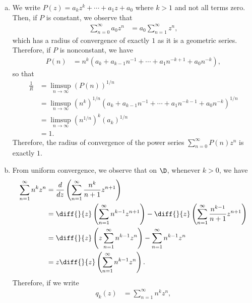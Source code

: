\documentclass[10pt]{mypackage}
\begin{document}
\begin{solution}\hfill
  \begin{enumerate}[(a)]
    \item We write $P(z) = a_kz^{k} + \cdots + a_1 z + a_0$ where $ k > 1 $ and not all terms zero. Then, if $P$ is constant, we observe that
      \begin{align*}
        \sum_{n=0}^{\infty}a_0z^{n} &= a_0\sum_{n=1}^{\infty}z^{n},
      \end{align*}
      which has a radius of convergence of exactly $1$ as it is a geometric series. Therefore, if $P$ is nonconstant, we have
      \begin{align*}
        P(n) &= n^{k}\left( a_k + a_{k-1}n^{-1} + \cdots + a_1 n^{-k+1} + a_0n^{-k} \right),
      \end{align*}
      so that
      \begin{align*}
        \frac{1}{R} &= \limsup_{n\rightarrow\infty} \left( P(n) \right)^{1/n}\\
                    &= \limsup_{n\rightarrow\infty} \left( n^{k} \right)^{1/n}\left( a_k + a_{k-1}n^{-1} + \cdots + a_1n^{-k-1} + a_0n^{-k} \right)^{1/n}\\
                    &= \limsup_{n\rightarrow\infty} \left( n^{1/n} \right)^{k}\left( a_k \right)^{1/n}\\
                    &= 1.
      \end{align*}
      Therefore, the radius of convergence of the power series $\sum_{n=0}^{\infty}P(n)z^{n}$ is exactly $1$.
    \item From uniform convergence, we observe that on $\D$, whenever $k > 0$, we have
      \begin{align*}
        \sum_{n=1}^{\infty}n^{k}z^{n} &= \frac{d}{dz}\left( \sum_{n=1}^{\infty} \frac{n^{k}}{n+1} z^{n+1} \right)\\
                                      &= \diff{}{z}\left( \sum_{n=1}^{\infty} n^{k-1}z^{n+1} \right) - \diff{}{z}\left( \sum_{n=1}^{\infty} \frac{n^{k-1}}{n+1}z^{n+1} \right)\\
                                      &= \diff{}{z}\left( z\sum_{n=1}^{\infty}n^{k-1}z^{n} \right) - \sum_{n=1}^{\infty} n^{k-1}z^{n}\\
                                      &= z\diff{}{z}\left( \sum_{n=1}^{\infty} n^{k-1}z^{n} \right).
      \end{align*}
      Therefore, if we write
      \begin{align*}
        q_k(z) &= \sum_{n=1}^{\infty} n^{k}z^{n},

\end{align*}
\end{enumerate}
\end{solution}
\end{document}

